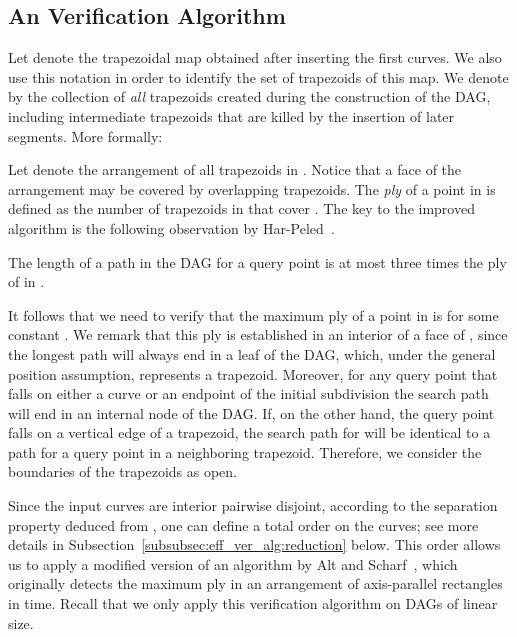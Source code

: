 \subsection{An  Verification Algorithm}
\label{subsec:eff_ver_alg:det}

Let \calTSi denote the trapezoidal map obtained after inserting the
first  curves.
We also use this notation in order to identify
the set of trapezoids of this map.
We denote by \Tall the collection of {\it all} trapezoids created during the
construction of the DAG, including intermediate trapezoids that are
killed by the insertion of later segments.
More formally:

Let \Arr{\Tall}
denote the arrangement of all trapezoids in \Tall .
Notice that a face of the arrangement
may be covered by overlapping trapezoids.
The {\it ply} of a point
 in \Arr{\Tall} is defined as the number of
trapezoids in \Tall that cover .
The key to the improved algorithm is the following observation by
Har-Peled~\cite{Har-personal-2012}.
\\

\noindent
\begin{observation} \label{obs:path_len_and_ply_relation}
The length of a path in the DAG for a query point
 is at most three times the ply of  in \Arr{\Tall}.
\end{observation}



It follows that we need to verify that the maximum ply of a point
in \Arr{\Tall} is  for
some constant .
We remark that this ply is established in an
interior of a face of \Arr{\Tall},
since the longest path will always end in a leaf of the DAG,
which, under the general position assumption, represents a trapezoid.
Moreover, for any query point that falls on either a curve or an endpoint
of the initial subdivision
the search path will end in an internal node of the DAG.
If, on the other hand, the query point 
falls on a vertical edge of a trapezoid,
the search path for  will be identical to a path
for a query point in a neighboring trapezoid.
Therefore, we consider the boundaries of the trapezoids as open.

Since the input curves are interior
pairwise disjoint,
according to the separation property deduced from \cite{GY-TSR-80},
one can define a total order on the curves;
see more details in Subsection~\ref{subsubsec:eff_ver_alg:reduction} below.
This order allows us to apply a modified version
of an algorithm by Alt and Scharf~\cite{as-cdaaa-13},
which originally detects the
maximum ply in an arrangement of 
axis-parallel rectangles in  time.
Recall that we only apply this verification algorithm on DAGs of
linear size.

